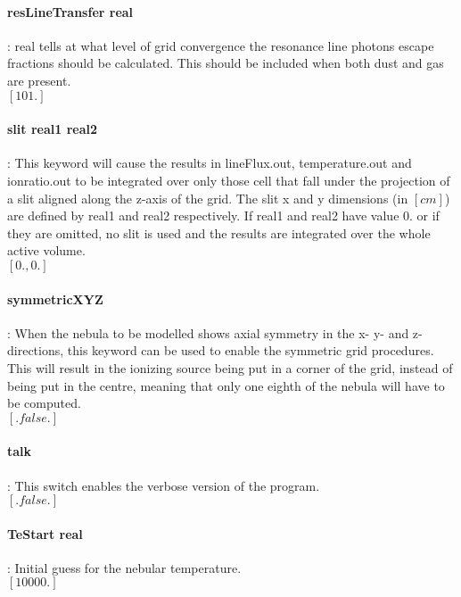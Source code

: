 \documentclass[11pt]{article}
\begin{document}
\paragraph   { resLineTransfer real} : real tells at what level of grid convergence the resonance 
                     line photons escape fractions should be calculated. This should be 
                     included when both dust and gas are present. \\
		     $[101.]$\\
    
\paragraph   { slit real1 real2} : This keyword will cause the results in lineFlux.out, temperature.out
                     and ionratio.out to be integrated over only those cell that fall under the 
                     projection of a slit aligned along the z-axis of the grid. The slit 
                     x and y dimensions (in $[cm]$) are defined by real1 and real2 respectively. 
		     If real1 and real2 have value 0. or if they are omitted, no slit is used 
		     and the results are integrated over the whole active volume.\\
                     $[0., 0.]$\\

\paragraph {   symmetricXYZ  }   : When the nebula to be modelled shows axial symmetry in the 
		     x- y- and z-directions, this keyword can be used to enable the
		     symmetric grid procedures. This will result in the ionizing 
		     source being put in a corner of the grid, instead of being put
		     in the centre, meaning that only one eighth of the nebula will
		     have to be computed. \\
		     $[.false.]$\\

\paragraph  {  talk   }          : This switch enables the verbose version of the program.\\
		     $[.false.]$\\


\paragraph   { TeStart real}     : Initial guess for the nebular temperature. \\
		     $[10000.]$\\
\end{document}
